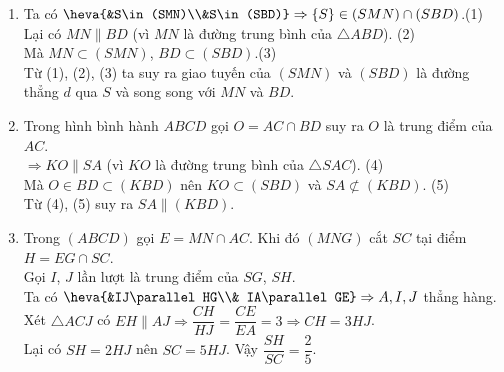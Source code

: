 \begin{bt}
\begin{bt}
{\begin{center}
	\end{center}
	\begin{enumerate}
		\item Ta có $\heva{&S\in(SMN)\\&S\in(SBD)}
			\Rightarrow \{S\}\in (SMN) \cap (SBD)$.\hfill (1)
		\\
		Lại có $MN\parallel BD$ (vì $MN$ là đường trung bình của $\triangle ABD$). \hfill (2)
		\\
		Mà $MN \subset (SMN)$, $BD\subset (SBD)$.\hfill (3)
		\\
		Từ (1), (2), (3) ta suy ra giao tuyến của $(SMN)$ và $(SBD)$ là đường thẳng $d$ qua $S$ và song song với $MN$ và $BD$.
		\item Trong hình bình hành $ABCD$ gọi $O=AC \cap BD$ suy ra $O$ là trung điểm của $AC$.
		\\
		$\Rightarrow KO \parallel SA$ (vì $KO$ là đường trung bình của $\triangle SAC$). \hfill (4)
		\\
		Mà $O\in BD \subset (KBD)$ nên $KO\subset (SBD)$ và $SA\not\subset (KBD)$.  \hfill (5)
		\\
		Từ (4), (5) suy ra $SA \parallel (KBD)$.
		\item Trong $(ABCD)$ gọi $E=MN\cap AC$. Khi đó $(MNG)$ cắt $SC$ tại điểm $H=EG\cap SC$.
		\\
		Gọi $I$, $J$ lần lượt là trung điểm của $SG$, $SH$.
		\\
		Ta có $\heva{&IJ\parallel HG\\& IA\parallel GE}\Rightarrow A,I,J$ thẳng hàng.
		\\
		Xét $\triangle ACJ$ có $EH\parallel AJ \Rightarrow \dfrac{CH}{HJ}=\dfrac{CE}{EA}=3 \Rightarrow CH=3HJ$.
		\\
		Lại có $SH=2HJ$ nên $SC=5HJ$. Vậy $\dfrac{SH}{SC}=\dfrac{2}{5}$.
	\end{enumerate}
	}
\end{bt}


\end{bt}
